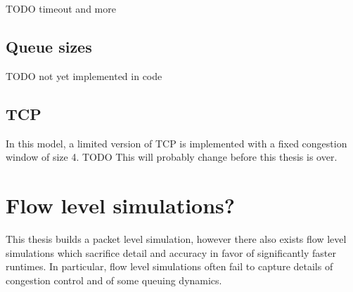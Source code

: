TODO timeout and more


\subsection{Queue sizes} \label{model-queues}
TODO not yet implemented in code


\subsection{TCP} \label{model-tcp}

In this model, a limited version of TCP is implemented with a fixed congestion window of size 4.
TODO This will probably change before this thesis is over.

\section{Flow level simulations?} \label{model-flow-level}

This thesis builds a packet level simulation, however there also exists flow level simulations which sacrifice detail and accuracy in favor of significantly faster runtimes.
In particular, flow level simulations often fail to capture details of congestion control and of some queuing dynamics.
